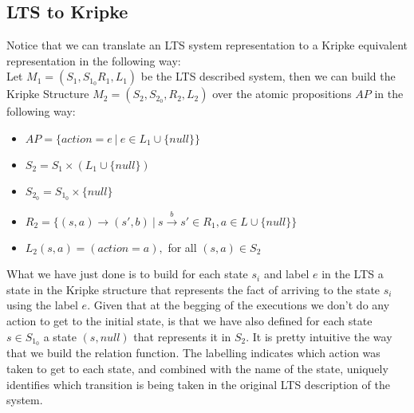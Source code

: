 \documentclass[12pt]{article}
\begin{document}
\subsection{LTS to Kripke}\label{lts2kripke}
Notice that we can translate an LTS system representation to a Kripke equivalent representation in the following way:\\

Let $M_1 = (S_1, S_{1_0} R_1, L_1)$ be the LTS described system, then we can build the Kripke Structure $M_2 = (S_2,S_{2_0},R_2,L_2)$ over the atomic propositions $AP$ in the following way:
\begin{itemize}
\item $ AP = \{action = e ~|~ e \in L_1 \cup \{null\}\} $
\item $ S_2 = S_1 \times (L_1 \cup \{null\}) $
\item $S_{2_0} = S_{1_0} \times \{null\}$
\item $R_2 = \{(s,a) \rightarrow (s',b) ~|~ s\overset{b}{\rightarrow}s' \in R_1, a \in L \cup \{null\}\}$
\item $L_2(s,a) = (action = a),$ for all $(s,a) \in S_2$
\end{itemize}
What we have just done is to build for each state $s_i$ and label $e$ in the LTS a state in the Kripke structure that represents the fact of arriving to the state $s_i$ using the label $e$. Given that at the begging of the executions we don't do any action to get to the initial state, is that we have also defined for each state $s \in S_{1_0}$ a state $(s,null)$ that represents it in $S_2$. It is pretty intuitive the way that we build the relation function. The labelling indicates which action was taken to get to each state, and combined with the name of the state, uniquely identifies which transition is being taken in the original LTS description of the system.
\end{document}

